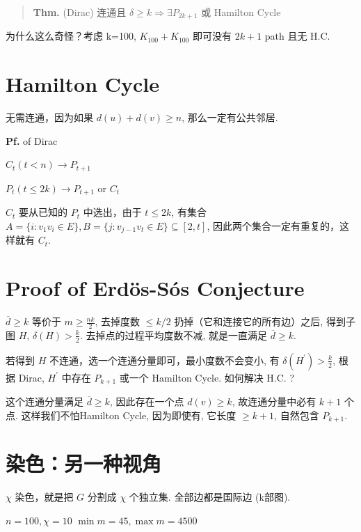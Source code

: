 \begin{quotation}
\textbf{Thm.} (Dirac) 连通且 $\delta\geq k\Rightarrow \exists P_{2k+1}$ 或 Hamilton Cycle
\end{quotation}

为什么这么奇怪？考虑 k=100, $K_{100}+K_{100}$ 即可没有 $2k+1$ path 且无 H.C.

\section{Hamilton Cycle}


无需连通，因为如果 $d(u)+d(v)\geq n$, 那么一定有公共邻居.

\textbf{Pf.} of Dirac

$C_t(t<n)\to P_{t+1}$

$P_{t}(t\leq 2k)\to P_{t+1}\text{ or }C_t$


$C_t$ 要从已知的 $P_t$ 中选出，由于 $t\leq 2k$, 有集合 $A=\{i:v_1v_i\in E\},B=\{j:v_{j-1}v_t\in E\}\subseteq[2,t]$, 因此两个集合一定有重复的，这样就有 $C_t$.

\section{Proof of Erdös-Sós Conjecture}

$\overline{d}\geq k$ 等价于 $m\geq\frac{nk}{2}$, 去掉度数 $\leq k/2$ 扔掉（它和连接它的所有边）之后, 得到子图 $H$, $\delta(H)>\frac{k}{2}$. 去掉点的过程平均度数不减, 就是一直满足 $\overline{d}\geq k$.

若得到 $H$ 不连通，选一个连通分量即可，最小度数不会变小, 有 $\delta(H^\prime)>\frac{k}{2}$, 根据 Dirac, $H^\prime$ 中存在 $P_{k+1}$ 或一个 Hamilton Cycle. 如何解决 H.C. ?

这个连通分量满足 $\overline{d}\geq k$, 因此存在一个点 $d(v)\geq k$, 故连通分量中必有 $k+1$ 个点. 这样我们不怕Hamilton Cycle, 因为即使有, 它长度 $\geq k+1$, 自然包含 $P_{k+1}$.

\section{染色：另一种视角}


$\chi$ 染色，就是把 $G$ 分割成 $\chi$ 个独立集. 全部边都是国际边 (k部图).

$n=100,\chi=10$ $\min m=45,\max m=4500$

